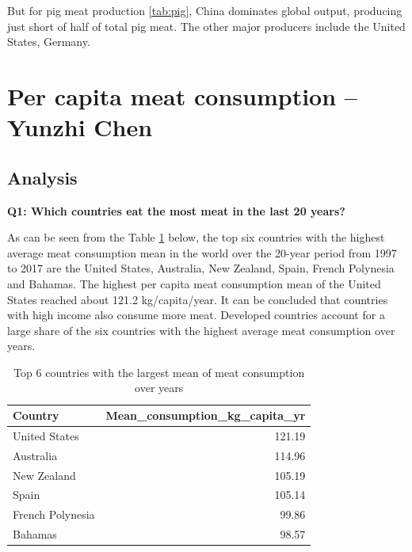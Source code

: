\documentclass[11pt,a4paper,]{article}
\begin{document}
But for pig meat production \ref{tab:pig}, China dominates global output, producing just short of half of total pig meat. The other major producers include the United States, Germany.
\clearpage

\section*{Per capita meat consumption -- Yunzhi Chen}

\subsection*{Analysis}

\textbf{Q1: Which countries eat the most meat in the last 20 years? }

As can be seen from the Table \ref{tab:highest-meanconsumption} below, the top six countries with the highest average meat consumption mean in the world over the 20-year period from 1997 to 2017 are the United States, Australia, New Zealand, Spain, French Polynesia and Bahamas. The highest per capita meat consumption mean of the United States reached about 121.2 kg/capita/year. It can be concluded that countries with high income also consume more meat. Developed countries account for a large share of the six countries with the highest average meat consumption over years.

\begin{table}

\caption{\label{tab:highest-meanconsumption}Top 6 countries with the largest mean of meat consumption over years}
\centering
\begin{tabular}[t]{l|r}
\hline
Country & Mean\_consumption\_kg\_capita\_yr\\
\hline
United States & 121.19\\
\hline
Australia & 114.96\\
\hline
New Zealand & 105.19\\
\hline
Spain & 105.14\\
\hline
French Polynesia & 99.86\\
\hline
Bahamas & 98.57\\
\hline
\end{tabular}
\end{table}
\clearpage
\end{document}
